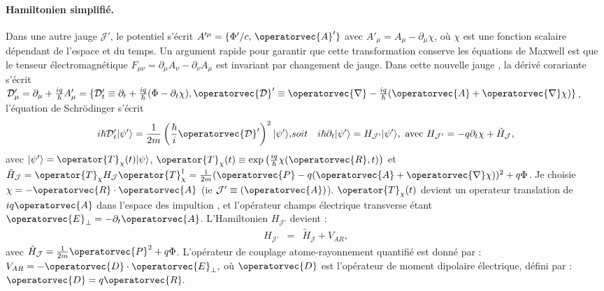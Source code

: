\paragraph{Hamiltonien simplifié.}

Dans une autre jauge $\mathcal{J}'$, le potentiel s’écrit $A'^\mu = \{ \Phi'/c,\, \operatorvec{A}' \}$ avec $ A'_\mu = A_\mu - \partial_\mu \chi$, où $\chi$ est une fonction scalaire dépendant de l’espace et du temps. Un argument rapide pour garantir que cette transformation conserve les équations de Maxwell est que le tenseur électromagnétique
\(
F_{\mu\nu} = \partial_\mu A_\nu - \partial_\nu A_\mu
\)
est invariant par changement de jauge. Dans cette nouvelle jauge , la dérivé corariante s'écrit $\mathcal{D}_\mu' = \partial_\mu + \frac{iq}{\hbar} A_\mu' = \{ \mathcal{D}_t' \equiv \partial_t + \frac{iq}{\hbar} ( \Phi - \partial_t \chi )   , \operatorvec{\mathcal{D}}' \equiv \operatorvec{\nabla} - \frac{iq}{\hbar} (\operatorvec{A} + \operatorvec{\nabla}\chi)\} $, l’équation de Schrödinger s'écrit
\begin{eqnarray*}
	i\hbar \mathcal{D}_t' \vert \psi' \rangle = \frac{1}{2m} \left( \frac{\hbar}{i} \operatorvec{\mathcal{D}}' \right)^2 \vert \psi' \rangle, & soit &  i\hbar \partial_t \vert \psi' \rangle = H_{\mathcal{J}'} \vert \psi' \rangle , ~\mbox{avec}~	H_{\mathcal{J}'} = -q\partial_t \chi + \tilde{H}_{\mathcal{J}},%
\end{eqnarray*}
avec $\vert \psi'\rangle = \operator{T}_\chi(t) \vert \psi\rangle$, $\operator{T}_\chi(t) \equiv \exp\left( \frac{iq}{\hbar} \chi(\operatorvec{R}, t) \right)$ et $\tilde{H}_{\mathcal{J}} = \operator{T}_\chi H_{\mathcal{J}}\operator{T}_\chi^\dag = \frac{1}{2m} ( \operatorvec{P} - q  ( \operatorvec{A} + \operatorvec{\nabla}\chi  )  )^2 + q \Phi $. Je choisie $\chi = - \operatorvec{R}\cdot\operatorvec{A}$ (ie $\mathcal{J}' \equiv (\operatorvec{A})$). $\operator{T}_\chi(t)$ devient un operateur translation de $iq \operatorvec{A}$ dans l’espace des impultion , et l'opérateur champs électrique transverse étant $\operatorvec{E}_\perp = - \partial_t \operatorvec{A}$. L'Hamiltonien $H_{\mathcal{J}'}$ devient :
\begin{eqnarray*}
	H_{\mathcal{J}'} & = & 	\tilde{H}_{\mathcal{J}}	+ V_{AR},
\end{eqnarray*}
avec $\tilde{H}_{\mathcal{J}} = \frac{1}{2m}\operatorvec{P}^2 +q \Phi$. L’opérateur de couplage atome-rayonnement quantifié est donné par :
\(
V_{AR} = - \operatorvec{D} \cdot \operatorvec{E}_\perp,
\)
où \(\operatorvec{D}\) est l’opérateur de moment dipolaire électrique, défini par :
\(
\operatorvec{D} = q \operatorvec{R}.
\)


